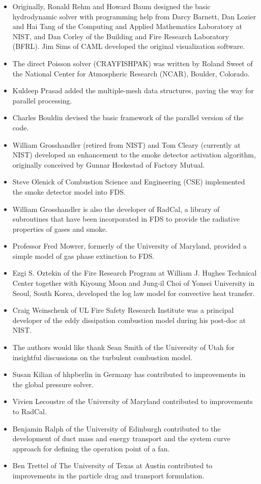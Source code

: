 \documentclass[11pt]{book}
\begin{document}
\begin{itemize}
\item Originally, Ronald Rehm and Howard Baum designed the basic hydrodynamic solver with programming help from Darcy Barnett, Dan Lozier and Hai Tang of the Computing and Applied Mathematics Laboratory at NIST, and Dan Corley of the Building and Fire Research Laboratory (BFRL). Jim Sims of CAML developed the original visualization software.
\item The direct Poisson solver (CRAYFISHPAK) was written by Roland Sweet of the National Center for Atmospheric Research (NCAR), Boulder, Colorado.
\item Kuldeep Prasad added the multiple-mesh data structures, paving the way for parallel processing.
\item Charles Bouldin devised the basic framework of the parallel version of the code.
\item William Grosshandler (retired from NIST) and Tom Cleary (currently at NIST) developed an enhancement to the smoke detector activation algorithm, originally conceived by Gunnar Heskestad of Factory Mutual.
\item Steve Olenick of Combustion Science and Engineering (CSE) implemented the smoke detector model into FDS.
\item William Grosshandler is also the developer of RadCal, a library of subroutines that have been incorporated in FDS to provide the radiative properties of gases and smoke.
\item Professor Fred Mowrer, formerly of the University of Maryland, provided a simple model of gas phase extinction to FDS.
\item Ezgi S. Oztekin of the Fire Research Program at William J. Hughes Technical Center together with Kiyoung Moon and Jung-il Choi of Yonsei University in Seoul, South Korea, developed the log law model for convective heat transfer.
\item Craig Weinschenk of UL Fire Safety Research Institute was a principal developer of the eddy dissipation combustion model during his post-doc at NIST.
\item The authors would like thank Sean Smith of the University of Utah for insightful discussions on the turbulent combustion model.
\item Susan Kilian of hhpberlin in Germany has contributed to improvements in the global pressure solver.
\item Vivien Lecoustre of the University of Maryland contributed to improvements to RadCal.
\item Benjamin Ralph of the University of Edinburgh contributed to the development of duct mass and energy transport and the system curve approach for defining the operation point of a fan.
\item Ben Trettel of The University of Texas at Austin contributed to improvements in the particle drag and transport formulation.
\end{itemize}
\end{document}
